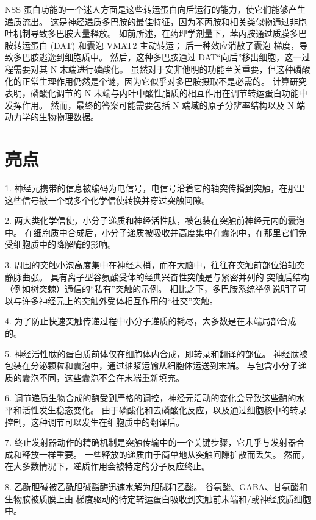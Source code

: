 NSS 蛋白功能的一个迷人方面是这些转运蛋白向后运行的能力，使它们能够产生递质流出。
这是神经递质多巴胺的最佳特征，因为苯丙胺和相关类似物通过非胞吐机制导致多巴胺大量释放。
如前所述，在药理学剂量下，苯丙胺通过质膜多巴胺转运蛋白 (DAT) 和囊泡 VMAT2 主动转运；
后一种效应消散了囊泡  梯度，导致多巴胺逃逸到细胞质中。
然后，这种多巴胺通过 DAT“向后”移出细胞，这一过程需要对其 N 末端进行磷酸化。
虽然对于安非他明的功能至关重要，但这种磷酸化的正常生理作用仍然是个谜，因为它似乎对多巴胺摄取不是必需的。
计算研究表明，磷酸化调节的 N 末端与内叶中酸性脂质的相互作用在调节转运蛋白功能中发挥作用。
然而，最终的答案可能需要包括 N 端域的原子分辨率结构以及 N 端动力学的生物物理数据。



\section{亮点}

1. 神经元携带的信息被编码为电信号，电信号沿着它的轴突传播到突触，在那里这些信号被一个或多个化学信使转换并穿过突触间隙。 


2. 两大类化学信使，小分子递质和神经活性肽，被包装在突触前神经元内的囊泡中。
在细胞质中合成后，小分子递质被吸收并高度集中在囊泡中，在那里它们免受细胞质中的降解酶的影响。 


3. 周围的突触小泡高度集中在神经末梢，而在大脑中，往往在突触前部位沿轴突静脉曲张。
具有离子型谷氨酸受体的经典兴奋性突触是与紧密并列的
突触后结构（例如树突棘）通信的“私有”突触的示例。 相比之下，多巴胺系统举例说明了可以与许多神经元上的突触外受体相互作用的“社交”突触。


4. 为了防止快速突触传递过程中小分子递质的耗尽，大多数是在末端局部合成的。


5. 神经活性肽的蛋白质前体仅在细胞体内合成，即转录和翻译的部位。
神经肽被包装在分泌颗粒和囊泡中，通过轴浆运输从细胞体运送到末端。
与包含小分子递质的囊泡不同，这些囊泡不会在末端重新填充。 


6. 调节递质生物合成的酶受到严格的调控，神经元活动的变化会导致这些酶的水平和活性发生稳态变化。
由于磷酸化和去磷酸化反应，以及通过细胞核中的转录控制，这种调节可以发生在细胞质中的翻译后。 


7. 终止发射器动作的精确机制是突触传输中的一个关键步骤，它几乎与发射器合成和释放一样重要。
一些释放的递质由于简单地从突触间隙扩散而丢失。
然而，在大多数情况下，递质作用会被特定的分子反应终止。 


8. 乙酰胆碱被乙酰胆碱酯酶迅速水解为胆碱和乙酸。
谷氨酸、GABA、甘氨酸和生物胺被质膜上由  梯度驱动的特定转运蛋白吸收到突触前末端和/或神经胶质细胞中。 


